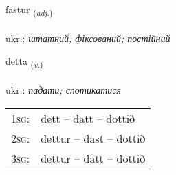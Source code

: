 \documentclass[frontgrid, backgrid]{flacards}\usepackage[]{graphicx}\usepackage[]{xcolor}
\begin{document}
\renewcommand{\blhead}{\vskip5pt {\small\bfseries\footnotesize Lýsingarorð | прикметник }}
\renewcommand{\bcfoot}{\vskip5pt \hspace{2pt}{\small\bfseries\footnotesize 1K}}


{fastur \small{\textsubscript{(\textit{adj.})}} \\[1ex] %
\textphonetic{[fastʏr]} \\
ukr.: \emph{штатний; фіксований; постійний} \\  [2ex]
\renewcommand*{\arraystretch}{0.8}
}

\renewcommand{\flhead}{\vskip5pt \fboxsep=0pt {\small\bfseries\footnotesize Sagnorð | дієслово}}
\renewcommand{\fcfoot}{\vskip5pt \fboxsep=0pt \hspace{2pt}{\small\bfseries\footnotesize 1K}}

\renewcommand{\blhead}{\vskip5pt {\small\bfseries\footnotesize Sagnorð | дієслово }}
\renewcommand{\bcfoot}{\vskip5pt \hspace{2pt}{\small\bfseries\footnotesize 1K}}


{detta \small{\textsubscript{(\textit{v.})}} \\[1ex] %
\textphonetic{[tɛhta]} \\
ukr.: \emph{падати; спотикатися} \\  [2ex]
\renewcommand*{\arraystretch}{0.8}
\begin{tabular}{p{1cm}l}
\textsc{1sg}: & dett -- datt -- dottið \\ 
\textsc{2sg}: & dettur -- dast -- dottið \\ 
\textsc{3sg}: & dettur -- datt -- dottið \\ 
\end{tabular}
}
\end{document}
